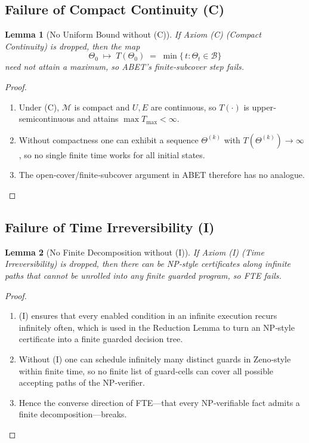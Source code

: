 \documentclass[12pt]{article}
\theoremstyle{definition}
\theoremstyle{plain}
\newtheorem{lemma}{Lemma}[section]
\begin{document}
\subsection{Failure of Compact Continuity (C)}

\begin{lemma}[No Uniform Bound without (C)]\label{lem:no-C}
If Axiom (C) (Compact Continuity) is dropped, then the map
\[
  \Theta_0 \;\mapsto\; T(\Theta_0) \;=\;\min\{\,t: \Theta_t\in\mathcal B\}
\]
need not attain a maximum, so ABET’s finite‐subcover step fails.
\end{lemma}
\begin{proof}
\begin{enumerate}[label=(\arabic*)]
  \item  Under (C), $\mathcal M$ is compact and $U,E$ are continuous, so $T(\cdot)$ is upper‐semicontinuous and attains $\max T_{\max}<\infty$.
  \item  Without compactness one can exhibit a sequence $\Theta^{(k)}$ with $T(\Theta^{(k)})\to\infty$, so no single finite time works for all initial states.  
  \item  The open‐cover/finite‐subcover argument in ABET therefore has no analogue.
\end{enumerate}
\end{proof}

\subsection{Failure of Time Irreversibility (I)}

\begin{lemma}[No Finite Decomposition without (I)]\label{lem:no-I}
If Axiom (I) (Time Irreversibility) is dropped, then there can be NP‐style
certificates along infinite paths that cannot be unrolled into any finite
guarded program, so FTE fails.
\end{lemma}
\begin{proof}
\begin{enumerate}[label=(\arabic*)]
  \item  (I) ensures that every enabled condition in an infinite execution
    recurs infinitely often, which is used in the Reduction Lemma to turn an
    NP‐style certificate into a finite guarded decision tree.
  \item  Without (I) one can schedule infinitely many distinct guards in
    Zeno‐style within finite time, so no finite list of guard‐cells can cover
    all possible accepting paths of the NP‐verifier.
  \item  Hence the converse direction of FTE—that every NP‐verifiable fact
    admits a finite decomposition—breaks.
\end{enumerate}
\end{proof}
\end{document}
